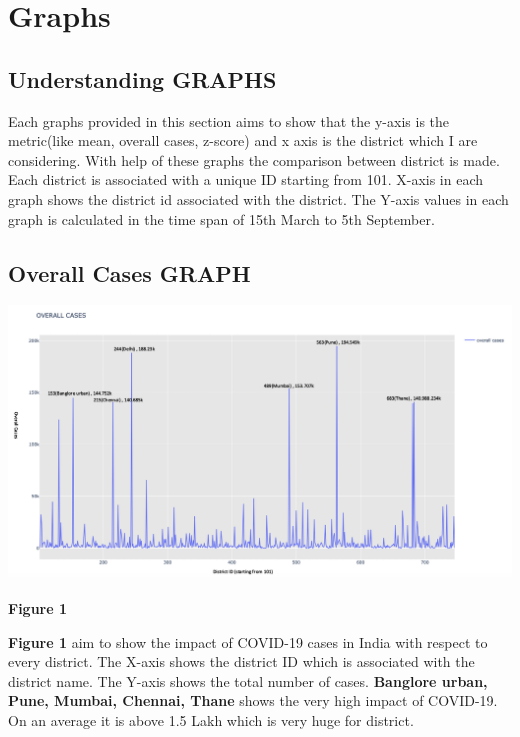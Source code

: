 \documentclass{report}
\begin{document}
\section{Graphs}
\subsection{Understanding GRAPHS}
\justify Each graphs provided in this section aims to show that the y-axis is the metric(like mean, overall cases, z-score) and x axis is the district which I are considering. With help of these graphs the comparison between district is made.
\newline
Each district is associated with a unique ID starting from 101. X-axis in each graph shows the district id associated with the district.
\newline 
The Y-axis values in each graph is calculated in the time span of 15th March to 5th September.

\subsection{Overall Cases GRAPH}
\includegraphics[scale=0.32]{images/OverallCases.png}
\centerline{\textbf{Figure 1}} \newline\newline
\justify \textbf{Figure 1} aim to show the impact of COVID-19 cases in India with respect to every district. The X-axis shows the district ID which is associated with the district name. The Y-axis shows the total number of cases. 
\newline \textbf{Banglore urban, Pune, Mumbai, Chennai, Thane} shows the very high impact of COVID-19. On an average it is above 1.5 Lakh which is very huge for district. 
    
\newpage
\end{document}
